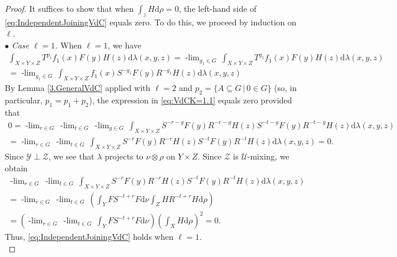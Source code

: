 \documentclass[10pt,a4paper]{amsart}
\newcommand{\plimgG}[3]{\mathop {#1\text{-lim}}_{#2\in #3}\,}
\begin{document}
\begin{proof}
It suffices to show that when $\int_z H\text{d}\rho=0$, the left-hand side of \eqref{eq:IndependentJoiningVdC} equals zero. 
To do this, we proceed by induction on $\ell$.\\

$\bullet$ \textit{ Case $\ell=1$.} When $\ell=1$, we have 
\begin{multline}\label{eq:VdCK=1.1}
\int_{X\times Y\times Z} T^{p_1}f_1(x)F(y)H(z)\text{d}\lambda(x,y,z)=
\plimgG{p_1}{g_1}{G}\int_{X\times Y\times Z} T^{g_1}f_1(x)F(y)H(z)\text{d}\lambda(x,y,z) \\
=\plimgG{p_1}{g_1}{G}\int_{X\times Y\times Z} f_1(x)S^{-g_1}F(y)R^{-g_1}H(z)\text{d}\lambda(x,y,z)
\end{multline}
By Lemma \ref{3.GeneralVdC} applied with $\ell=2$ and $p_2=\{A\subseteq G\,|\,0\in G\}$ (so, in particular, $p_1=p_1+p_2$), the expression in \eqref{eq:VdCK=1.1} equals zero provided that 
\begin{multline}\label{eq:VdCk=1.2}
0=\plimgG{p_1}{r}{G}\plimgG{p_1}{t}{G}\plimgG{p_2}{g}{G}\int_{X\times Y\times Z} S^{-r-g}F(y)R^{-r-g}H(z)S^{-t-g}F(y)R^{-t-g}H(z)\text{d}\lambda(x,y,z)\\
=\plimgG{p_1}{r}{G}\plimgG{p_1}{t}{G}\int_{X\times Y\times Z} S^{-r}F(y)R^{-r}H(z)S^{-t}F(y)R^{-t}H(z)\text{d}\lambda(x,y,z)=0.
\end{multline}
Since $\mathcal{Y}\perp\mathcal{Z}$, we see that $\lambda$ projects to $\nu\otimes\rho$ on $Y\times Z$.
Since $\mathcal Z$ is $\mathcal U$-mixing, we obtain
\begin{multline}
    \plimgG{p_1}{r}{G}\plimgG{p_1}{t}{G}\int_{X\times Y\times Z} S^{-r}F(y)R^{-r}H(z)S^{-t}F(y)R^{-t}H(z)\text{d}\lambda(x,y,z)\\
    = \plimgG{p_1}{r}{G}\plimgG{p_1}{t}{G}\left(\int_{Y}FS^{-t+r}F\text{d}\nu\int_Z HR^{-t+r}H\text{d}\rho\right)\\
    =\left(\plimgG{p_1}{r}{G}\plimgG{p_1}{t}{G}\int_{Y}FS^{-t+r}F\text{d}\nu\right)\left(\int_X H\text{d}\rho\right)^2=0.
\end{multline}
Thus, \eqref{eq:IndependentJoiningVdC} holds when $\ell=1$.\\ 


\end{proof}
\end{document}

